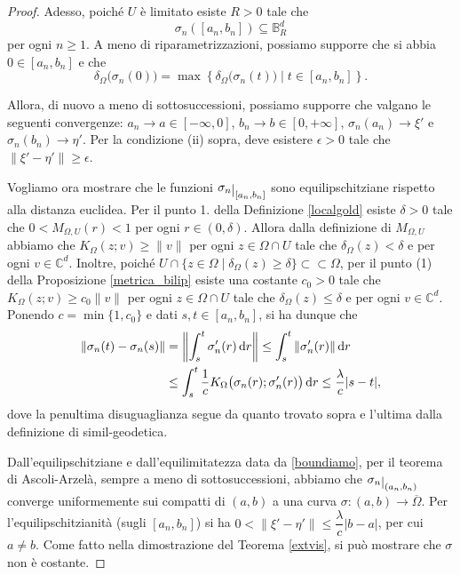 \begin{proof}
    Adesso, poiché $U$ è limitato esiste $R>0$ tale che
    \begin{equation}\label{boundiamo}
        \sigma_n([a_n,b_n])\subseteq\mathbb{B}^d_R
    \end{equation}
    per ogni $n\ge 1$. A meno di riparametrizzazioni, possiamo supporre che si abbia $0\in[a_n,b_n]$ e che
    $$\delta_\Omega\big(\sigma_n(0)\big)=\max\left\{\delta_\Omega\big(\sigma_n(t)\big)\mid t\in[a_n,b_n]\right\}.$$

    Allora, di nuovo a meno di sottosuccessioni, possiamo supporre che valgano le seguenti convergenze: $a_n\longrightarrow a\in[-\infty,0]$, $b_n\longrightarrow b\in[0,+\infty]$, $\sigma_n(a_n)\longrightarrow\xi'$ e $\sigma_n(b_n)\longrightarrow\eta'$. Per la condizione (ii) sopra, deve esistere $\epsilon>0$ tale che $\|\xi'-\eta'\|\ge\epsilon$.

    Vogliamo ora mostrare che le funzioni $\sigma_n\restrict{[a_n,b_n]}$ sono equilipschitziane rispetto alla distanza euclidea. Per il punto 1. della Definizione \ref{localgold} esiste $\delta>0$ tale che $0<M_{\Omega,U}(r)<1$ per ogni $r\in(0,\delta)$. Allora dalla definizione di $M_{\Omega,U}$ abbiamo che $K_\Omega(z;v)\ge\|v\|$ per ogni $z\in\Omega\cap U$ tale che $\delta_\Omega(z)<\delta$ e per ogni $v\in\mathbb{C}^d$. Inoltre, poiché $U\cap\{z\in\Omega\mid\delta_\Omega(z)\ge\delta\}\subset\subset\Omega$, per il punto (1) della Proposizione \ref{metrica_bilip} esiste una costante $c_0>0$ tale che $K_\Omega(z;v)\ge c_0\|v\|$ per ogni $z\in\Omega\cap U$ tale che $\delta_\Omega(z)\le\delta$ e per ogni $v\in\mathbb{C}^d$. Ponendo $c=\min\{1,c_0\}$ e dati $s,t\in[a_n,b_n]$, si ha dunque che
    \begin{align*}
        \|\sigma_n(t)-\sigma_n(s)\|&=\left\|\int_s^t \sigma_n'(r)\mathop{}\!\mathrm{d} r\right\| \le \int_s^t \|\sigma_n'(r)\|\mathop{}\!\mathrm{d} r\\
        &\le \int_s^t \frac{1}{c}K_\Omega\big(\sigma_n(r);\sigma_n'(r)\big)\mathop{}\!\mathrm{d} r\le \frac{\lambda}{c}|s-t|,
    \end{align*}
    dove la penultima disuguaglianza segue da quanto trovato sopra e l'ultima dalla definizione di simil-geodetica.

    Dall'equilipschitziane e dall'equilimitatezza data da \eqref{boundiamo}, per il teorema di Ascoli-Arzelà, sempre a meno di sottosuccessioni, abbiamo che $\sigma_n\restrict{(a_n,b_n)}$ converge uniformemente sui compatti di $(a,b)$ a una curva $\sigma:(a,b)\longrightarrow\overline{\Omega}$. Per l'equilipschitzianità (sugli $[a_n,b_n]$) si ha $0<\|\xi'-\eta'\|\le \dfrac{\lambda}{c}|b-a|$, per cui $a\not=b$. Come fatto nella dimostrazione del Teorema \ref{extvis}, si può mostrare che $\sigma$ non è costante.


\end{proof}
